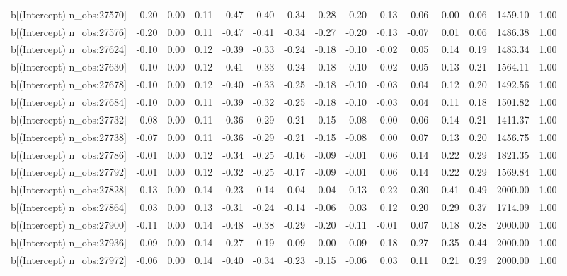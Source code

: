 \begin{table}[ht]
\begin{tabular}{rrrrrrrrrrrrrrr}
  b[(Intercept) n\_obs:27570] & -0.20 & 0.00 & 0.11 & -0.47 & -0.40 & -0.34 & -0.28 & -0.20 & -0.13 & -0.06 & -0.00 & 0.06 & 1459.10 & 1.00 \\ 
  b[(Intercept) n\_obs:27576] & -0.20 & 0.00 & 0.11 & -0.47 & -0.41 & -0.34 & -0.27 & -0.20 & -0.13 & -0.07 & 0.01 & 0.06 & 1486.38 & 1.00 \\ 
  b[(Intercept) n\_obs:27624] & -0.10 & 0.00 & 0.12 & -0.39 & -0.33 & -0.24 & -0.18 & -0.10 & -0.02 & 0.05 & 0.14 & 0.19 & 1483.34 & 1.00 \\ 
  b[(Intercept) n\_obs:27630] & -0.10 & 0.00 & 0.12 & -0.41 & -0.33 & -0.24 & -0.18 & -0.10 & -0.02 & 0.05 & 0.13 & 0.21 & 1564.11 & 1.00 \\ 
  b[(Intercept) n\_obs:27678] & -0.10 & 0.00 & 0.12 & -0.40 & -0.33 & -0.25 & -0.18 & -0.10 & -0.03 & 0.04 & 0.12 & 0.20 & 1492.56 & 1.00 \\ 
  b[(Intercept) n\_obs:27684] & -0.10 & 0.00 & 0.11 & -0.39 & -0.32 & -0.25 & -0.18 & -0.10 & -0.03 & 0.04 & 0.11 & 0.18 & 1501.82 & 1.00 \\ 
  b[(Intercept) n\_obs:27732] & -0.08 & 0.00 & 0.11 & -0.36 & -0.29 & -0.21 & -0.15 & -0.08 & -0.00 & 0.06 & 0.14 & 0.21 & 1411.37 & 1.00 \\ 
  b[(Intercept) n\_obs:27738] & -0.07 & 0.00 & 0.11 & -0.36 & -0.29 & -0.21 & -0.15 & -0.08 & 0.00 & 0.07 & 0.13 & 0.20 & 1456.75 & 1.00 \\ 
  b[(Intercept) n\_obs:27786] & -0.01 & 0.00 & 0.12 & -0.34 & -0.25 & -0.16 & -0.09 & -0.01 & 0.06 & 0.14 & 0.22 & 0.29 & 1821.35 & 1.00 \\ 
  b[(Intercept) n\_obs:27792] & -0.01 & 0.00 & 0.12 & -0.32 & -0.25 & -0.17 & -0.09 & -0.01 & 0.06 & 0.14 & 0.22 & 0.29 & 1569.84 & 1.00 \\ 
  b[(Intercept) n\_obs:27828] & 0.13 & 0.00 & 0.14 & -0.23 & -0.14 & -0.04 & 0.04 & 0.13 & 0.22 & 0.30 & 0.41 & 0.49 & 2000.00 & 1.00 \\ 
  b[(Intercept) n\_obs:27864] & 0.03 & 0.00 & 0.13 & -0.31 & -0.24 & -0.14 & -0.06 & 0.03 & 0.12 & 0.20 & 0.29 & 0.37 & 1714.09 & 1.00 \\ 
  b[(Intercept) n\_obs:27900] & -0.11 & 0.00 & 0.14 & -0.48 & -0.38 & -0.29 & -0.20 & -0.11 & -0.01 & 0.07 & 0.18 & 0.28 & 2000.00 & 1.00 \\ 
  b[(Intercept) n\_obs:27936] & 0.09 & 0.00 & 0.14 & -0.27 & -0.19 & -0.09 & -0.00 & 0.09 & 0.18 & 0.27 & 0.35 & 0.44 & 2000.00 & 1.00 \\ 
  b[(Intercept) n\_obs:27972] & -0.06 & 0.00 & 0.14 & -0.40 & -0.34 & -0.23 & -0.15 & -0.06 & 0.03 & 0.11 & 0.21 & 0.29 & 2000.00 & 1.00 \\ 

\end{tabular}
\end{table}
